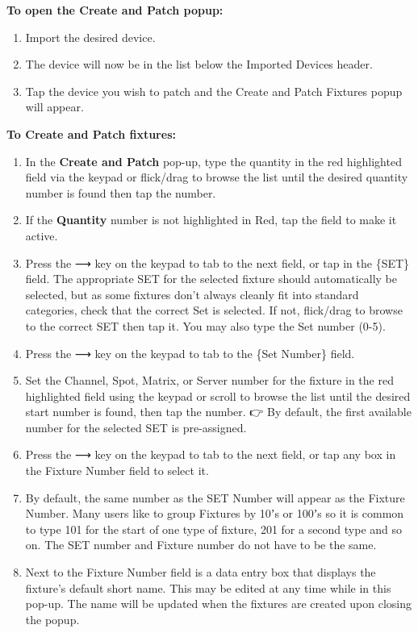 \documentclass[
]{article}
\begin{document}
\textbf{To open the Create and Patch popup:}

\begin{enumerate}
\def\labelenumi{\arabic{enumi}.}
\item
  Import the desired device.
\item
  The device will now be in the list below the Imported Devices header.
\item
  Tap the device you wish to patch and the Create and Patch Fixtures popup will appear.
\end{enumerate}

\textbf{To Create and Patch fixtures:}

\begin{enumerate}
\def\labelenumi{\arabic{enumi}.}
\item
  In the \textbf{Create and Patch} pop-up, type the quantity in the red highlighted field via the keypad or flick/drag to browse the list until the desired quantity number is found then tap the number.
\item
  If the \textbf{Quantity} number is not highlighted in {Red}, tap the field to make it active.
\item
  Press the ⟶ key on the keypad to tab to the next field, or tap in the \{SET\} field. The appropriate SET for the selected fixture should automatically be selected, but as some fixtures don't always cleanly fit into standard categories, check that the correct Set is selected. If not, flick/drag to browse to the correct SET then tap it. You may also type the Set number (0-5).
\item
  Press the ⟶ key on the keypad to tab to the \{Set Number\} field.
\item
  Set the Channel, Spot, Matrix, or Server number for the fixture in the red highlighted field using the keypad or scroll to browse the list until the desired start number is found, then tap the number.
  👉 By default, the first available number for the selected SET is pre-assigned.
\item
  Press the ⟶ key on the keypad to tab to the next field, or tap any box in the Fixture Number field to select it.
\item
  By default, the same number as the SET Number will appear as the Fixture Number. Many users like to group Fixtures by 10ʼs or 100ʼs so it is common to type 101 for the start of one type of fixture, 201 for a second type and so on. The SET number and Fixture number do not have to be the same.
\item
  Next to the Fixture Number field is a data entry box that displays the fixture's default short name. This may be edited at any time while in this pop-up. The name will be updated when the fixtures are created upon closing the popup.

\end{enumerate}
\end{document}
